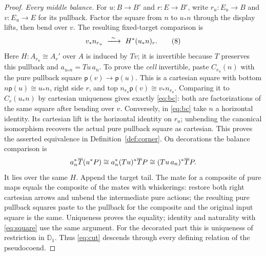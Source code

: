 \documentclass[11pt]{article}
\theoremstyle{definition}\newtheorem{definition}[theorem]{Definition}
\newcommand{\D}{\mathbb D}\newcommand{\N}{\mathbb N}
\newcommand{\pure}{\mathsf{p}}\newcommand{\grade}{\mathsf G}
\begin{document}
\begin{proof}
\emph{Every middle balance.} For $u:B\to B'$ and $r:E\to B'$,
write $r_u:E_u\to B$ and $v:E_u\to E$ for its pullback. Factor the
square from $n$ to $u_*n$ through the display lifts, then bend over
$v$. The resulting fixed-target comparison is
\[
       v_* n_{r_u}\ \xrightarrow{\ \sim\ }\ H^*(u_*n)_r .
 \tag{8}\label{eq:bc}
\]
Here $H:A_{r_u}\cong A_r'$ over $A$ is induced by $Tv$; it is
invertible because $T$ preserves this pullback and
$a_{u_*n}=Tu\,a_n$. To prove the \emph{cell} invertible, paste
$C_{r_u}(n)$ with the pure pullback square $\pure(v)\to\pure(u)$.
This is a cartesian square with bottom $n\pure(u)\cong u_*n$,
right side $r$, and top $n_{r_u}\pure(v)\cong v_*n_{r_u}$.
Comparing it to $C_r(u_*n)$ by cartesian uniqueness gives exactly
\eqref{eq:bc}: both are factorizations of the same square after
bending over $v$. Conversely, in \eqref{eq:bc} take $n$ a
horizontal identity. Its cartesian lift is the horizontal identity
on $r_u$; unbending the canonical isomorphism recovers the actual
pure pullback square as cartesian. This proves the asserted equivalence
in Definition~\ref{def:corner}. On decorations the balance comparison is
\[
     a_n^*\overline T(u^*P)\cong a_n^*(Tu)^*\overline T P
       \cong (Tu\,a_n)^*\overline T P .
\]
It lies over the same $H$. Append the target tail. The mate for a
composite of pure maps equals the composite of the mates with
whiskerings: restore both right cartesian arrows and unbend the
intermediate pure actions; the resulting pure pullback squares paste
to the pullback for the composite and the original input square is
the same. Uniqueness proves the equality; identity and naturality
with \eqref{eq:square} use the same argument. For the decorated part
this is uniqueness of restriction in $\D_1$. Thus \eqref{eq:cut}
descends through every defining relation of the pseudocoend.


\end{proof}
\end{document}
